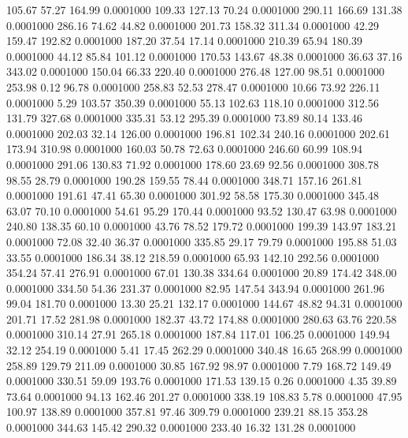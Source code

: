  105.67   57.27  164.99   0.0001000
 109.33  127.13   70.24   0.0001000
 290.11  166.69  131.38   0.0001000
 286.16   74.62   44.82   0.0001000
 201.73  158.32  311.34   0.0001000
  42.29  159.47  192.82   0.0001000
 187.20   37.54   17.14   0.0001000
 210.39   65.94  180.39   0.0001000
  44.12   85.84  101.12   0.0001000
 170.53  143.67   48.38   0.0001000
  36.63   37.16  343.02   0.0001000
 150.04   66.33  220.40   0.0001000
 276.48  127.00   98.51   0.0001000
 253.98    0.12   96.78   0.0001000
 258.83   52.53  278.47   0.0001000
  10.66   73.92  226.11   0.0001000
   5.29  103.57  350.39   0.0001000
  55.13  102.63  118.10   0.0001000
 312.56  131.79  327.68   0.0001000
 335.31   53.12  295.39   0.0001000
  73.89   80.14  133.46   0.0001000
 202.03   32.14  126.00   0.0001000
 196.81  102.34  240.16   0.0001000
 202.61  173.94  310.98   0.0001000
 160.03   50.78   72.63   0.0001000
 246.60   60.99  108.94   0.0001000
 291.06  130.83   71.92   0.0001000
 178.60   23.69   92.56   0.0001000
 308.78   98.55   28.79   0.0001000
 190.28  159.55   78.44   0.0001000
 348.71  157.16  261.81   0.0001000
 191.61   47.41   65.30   0.0001000
 301.92   58.58  175.30   0.0001000
 345.48   63.07   70.10   0.0001000
  54.61   95.29  170.44   0.0001000
  93.52  130.47   63.98   0.0001000
 240.80  138.35   60.10   0.0001000
  43.76   78.52  179.72   0.0001000
 199.39  143.97  183.21   0.0001000
  72.08   32.40   36.37   0.0001000
 335.85   29.17   79.79   0.0001000
 195.88   51.03   33.55   0.0001000
 186.34   38.12  218.59   0.0001000
  65.93  142.10  292.56   0.0001000
 354.24   57.41  276.91   0.0001000
  67.01  130.38  334.64   0.0001000
  20.89  174.42  348.00   0.0001000
 334.50   54.36  231.37   0.0001000
  82.95  147.54  343.94   0.0001000
 261.96   99.04  181.70   0.0001000
  13.30   25.21  132.17   0.0001000
 144.67   48.82   94.31   0.0001000
 201.71   17.52  281.98   0.0001000
 182.37   43.72  174.88   0.0001000
 280.63   63.76  220.58   0.0001000
 310.14   27.91  265.18   0.0001000
 187.84  117.01  106.25   0.0001000
 149.94   32.12  254.19   0.0001000
   5.41   17.45  262.29   0.0001000
 340.48   16.65  268.99   0.0001000
 258.89  129.79  211.09   0.0001000
  30.85  167.92   98.97   0.0001000
   7.79  168.72  149.49   0.0001000
 330.51   59.09  193.76   0.0001000
 171.53  139.15    0.26   0.0001000
   4.35   39.89   73.64   0.0001000
  94.13  162.46  201.27   0.0001000
 338.19  108.83    5.78   0.0001000
  47.95  100.97  138.89   0.0001000
 357.81   97.46  309.79   0.0001000
 239.21   88.15  353.28   0.0001000
 344.63  145.42  290.32   0.0001000
 233.40   16.32  131.28   0.0001000
